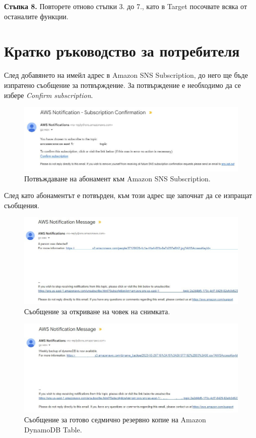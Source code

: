 \documentclass[12pt]{article}
\begin{document}
\noindent\textbf{Стъпка 8.} Повторете отново стъпки 3. до 7., като в Target посочвате всяка от останалите функции.

\clearpage
\pagebreak


\section{Кратко ръководство за потребителя}

\hspace{\parindent}След добавянето на имейл адрес в Amazon SNS Subscription, до него ще бъде изпратено съобщение за потвърждение. За потвърждение е необходимо да се избере \textit{Confirm subscription}.

\begin{figure}[h!]
\centering
    \includegraphics[scale=0.8]{user_guide/1.jpg}
  \caption{Потвъждаване на абонамент към Amazon SNS Subscription.}
\end{figure}

След като абонаментът е потвърден, към този адрес ще започнат да се изпращат съобщения.

\begin{figure}[h!]
\centering
    \includegraphics[scale=0.6]{user_guide/4.jpg}
  \caption{Съобщение за откриване на човек на снимката.}
\end{figure}

\begin{figure}[h!]
\centering
    \includegraphics[scale=0.6]{user_guide/3.jpg}
  \caption{Съобщение за готово седмично резервно копие на Amazon DynamoDB Table.}
\end{figure}
\end{document}
